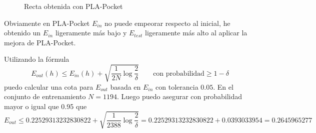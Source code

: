 \documentclass[a4]{article}
\begin{document}
\begin{figure}[H]
    \centering
    \caption{Recta obtenida con PLA-Pocket}
    \label{fig:lin-regress}
\end{figure}
\vspace{-3mm}

Obviamente en PLA-Pocket $E_{in}$ no puede empeorar respecto al inicial,
he obtenido un $E_{in}$ ligeramente más bajo y $E_{test}$ ligeramente más alto 
al aplicar la mejora de PLA-Pocket.

Utilizando la fórmula
\[E_{out}(h)\leq E_{in}(h)+\sqrt{\frac{1}{2N}\log{\frac{2}{\delta}}}\qquad\text{con probabilidad}\geq 1-\delta\]
puedo calcular una cota para $E_{out}$ basada en $E_{in}$ con tolerancia $0.05$.
En el conjunto de entrenamiento $N=1194$. Luego puedo asegurar con probabilidad mayor o igual que 0.95 que
\[E_{out}\leq 0.22529313232830822 + \sqrt{\frac{1}{2388}\log{\frac{2}{\delta}}}=0.22529313232830822+0.0393033954=0.2645965277\]
\end{document}

